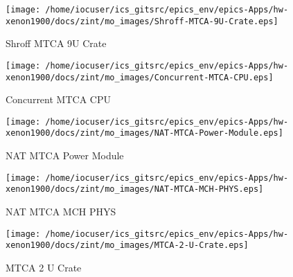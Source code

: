 \noindent
\vspace{1.4cm}
\begin{minipage}{.2\textwidth}
\begin{center}
\texttt{[image: /home/iocuser/ics\_gitsrc/epics\_env/epics-Apps/hw-xenon1900/docs/zint/mo\_images/Shroff-MTCA-9U-Crate.eps]}
\end{center}
\end{minipage}
\begin{minipage}{.7\textwidth}
Shroff MTCA 9U Crate
\end{minipage}


\noindent
\vspace{1.4cm}
\begin{minipage}{.2\textwidth}
\begin{center}
\texttt{[image: /home/iocuser/ics\_gitsrc/epics\_env/epics-Apps/hw-xenon1900/docs/zint/mo\_images/Concurrent-MTCA-CPU.eps]}
\end{center}
\end{minipage}
\begin{minipage}{.7\textwidth}
Concurrent MTCA CPU
\end{minipage}


\noindent
\vspace{1.4cm}
\begin{minipage}{.2\textwidth}
\begin{center}
\texttt{[image: /home/iocuser/ics\_gitsrc/epics\_env/epics-Apps/hw-xenon1900/docs/zint/mo\_images/NAT-MTCA-Power-Module.eps]}
\end{center}
\end{minipage}
\begin{minipage}{.7\textwidth}
NAT MTCA Power Module
\end{minipage}


\noindent
\vspace{1.4cm}
\begin{minipage}{.2\textwidth}
\begin{center}
\texttt{[image: /home/iocuser/ics\_gitsrc/epics\_env/epics-Apps/hw-xenon1900/docs/zint/mo\_images/NAT-MTCA-MCH-PHYS.eps]}
\end{center}
\end{minipage}
\begin{minipage}{.7\textwidth}
NAT MTCA MCH PHYS
\end{minipage}


\noindent
\vspace{1.4cm}
\begin{minipage}{.2\textwidth}
\begin{center}
\texttt{[image: /home/iocuser/ics\_gitsrc/epics\_env/epics-Apps/hw-xenon1900/docs/zint/mo\_images/MTCA-2-U-Crate.eps]}
\end{center}
\end{minipage}
\begin{minipage}{.7\textwidth}
MTCA 2 U Crate
\end{minipage}


